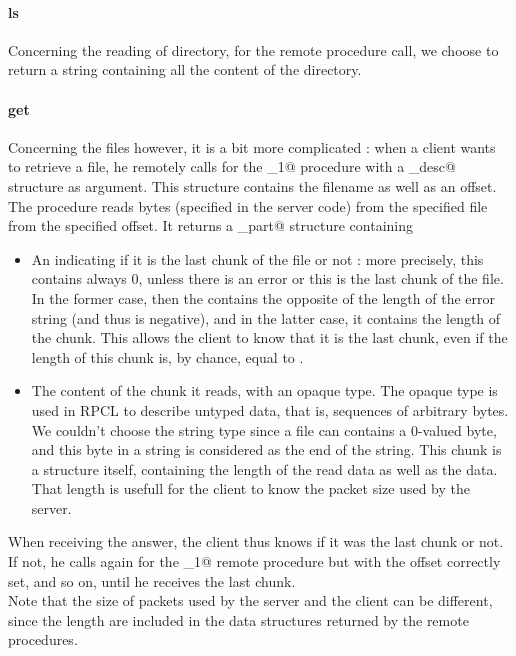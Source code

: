\documentclass{article}
\begin{document}
\paragraph{ls} Concerning the reading of directory, for the \verb@ls@ remote procedure call, we choose to return a string containing all the content of the directory.

\paragraph{get} Concerning the files however, it is a bit more complicated : when a client wants to retrieve a file, he remotely calls for the \verb@rget_1@ procedure with a \verb@file_desc@ structure as argument. This structure contains the filename as well as an offset. The procedure reads \verb@PSIZE@ bytes (specified in the server code) from the specified file from the specified offset. It returns a \verb@file_part@ structure containing 
\begin{itemize}
\item An \verb@int@ indicating if it is the last chunk of the file or not : more precisely, this \verb@int@ contains always 0, unless there is an error or this is the last chunk of the file. In the former case, then the \verb@int@ contains the opposite of the length of the error string (and thus is negative), and in the latter case, it contains the length of the chunk. This allows the client to know that it is the last chunk, even if the length of this chunk is, by chance, equal to \verb@PSIZE@.
\item The content of the chunk it reads, with an opaque type. The opaque type is used in RPCL to describe untyped data, that is, sequences of arbitrary bytes. We couldn't choose the string type since a file can contains a 0-valued byte, and this byte in a string is considered as the end of the string. This chunk is a structure itself, containing the length of the read data as well as the data. That length is usefull for the client to know the packet size used by the server.
\end{itemize}

When receiving the answer, the client thus knows if it was the last chunk or not. If not, he calls again for the 
 \verb@rget_1@ remote procedure but with the offset correctly set, and so on, until he receives the last chunk.\\
 
Note that the size of packets used by the server and the client can be different, since the length are included in the data structures returned by the remote procedures.\\
\end{document}
